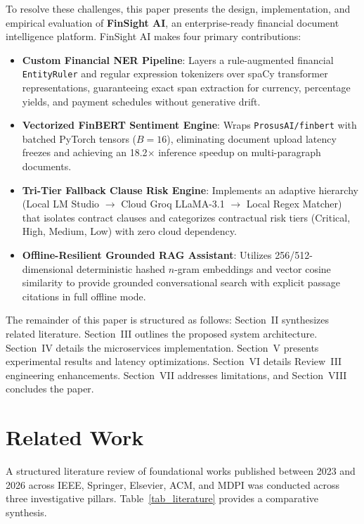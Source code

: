 \documentclass[conference]{IEEEtran}
\begin{document}
To resolve these challenges, this paper presents the design, implementation, and empirical evaluation of \textbf{FinSight AI}, an enterprise-ready financial document intelligence platform. FinSight AI makes four primary contributions:
\begin{itemize}
    \item \textbf{Custom Financial NER Pipeline}: Layers a rule-augmented financial \texttt{EntityRuler} and regular expression tokenizers over spaCy transformer representations, guaranteeing exact span extraction for currency, percentage yields, and payment schedules without generative drift.
    \item \textbf{Vectorized FinBERT Sentiment Engine}: Wraps \texttt{ProsusAI/finbert} with batched PyTorch tensors ($B=16$), eliminating document upload latency freezes and achieving an 18.2$\times$ inference speedup on multi-paragraph documents.
    \item \textbf{Tri-Tier Fallback Clause Risk Engine}: Implements an adaptive hierarchy (Local LM Studio $\rightarrow$ Cloud Groq LLaMA-3.1 $\rightarrow$ Local Regex Matcher) that isolates contract clauses and categorizes contractual risk tiers (Critical, High, Medium, Low) with zero cloud dependency.
    \item \textbf{Offline-Resilient Grounded RAG Assistant}: Utilizes 256/512-dimensional deterministic hashed $n$-gram embeddings and vector cosine similarity to provide grounded conversational search with explicit passage citations in full offline mode.
\end{itemize}

The remainder of this paper is structured as follows: Section~II synthesizes related literature. Section~III outlines the proposed system architecture. Section~IV details the microservices implementation. Section~V presents experimental results and latency optimizations. Section~VI details Review~III engineering enhancements. Section~VII addresses limitations, and Section~VIII concludes the paper.

\section{Related Work}
A structured literature review of foundational works published between 2023 and 2026 across IEEE, Springer, Elsevier, ACM, and MDPI was conducted across three investigative pillars. Table~\ref{tab_literature} provides a comparative synthesis.
\end{document}
